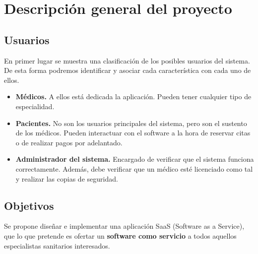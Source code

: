 \section{Descripción general del proyecto} %
\label{sec:descripcion_general_del_proyecto}
	\subsection {Usuarios}
	En primer lugar se muestra una clasificación de los posibles usuarios del sistema. De esta forma podremos identificar y asociar cada característica con cada uno de ellos. 

	\begin{itemize}
	\item \textbf{Médicos.} A ellos está dedicada la aplicación. Pueden tener cualquier tipo de especialidad.
	\item \textbf{Pacientes.} No son los usuarios principales del sistema, pero son el sustento de los médicos. Pueden interactuar con el software a la hora de reservar citas o de realizar pagos por adelantado.
	\item \textbf{Administrador del sistema.} Encargado de verificar que el sistema funciona correctamente. Además, debe verificar que un médico esté licenciado como tal y realizar las copias de seguridad.
	\end{itemize}

	\subsection{Objetivos}
	Se propone diseñar e implementar una aplicación SaaS (Software as a Service), que lo que pretende es ofertar un {\bf software como servicio} a todos aquellos especialistas sanitarios interesados. 

